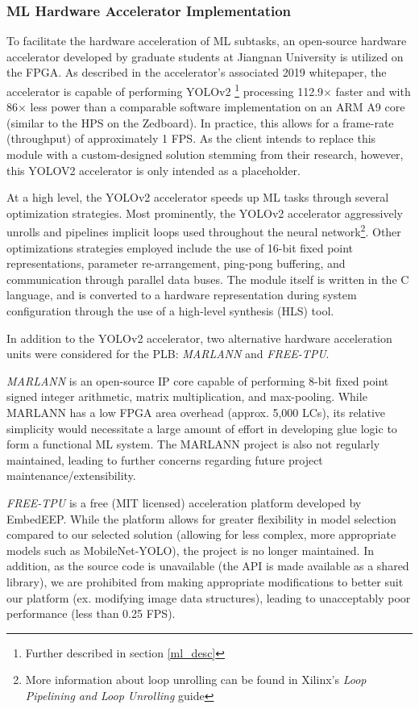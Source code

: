 \subsubsection{ML Hardware Accelerator Implementation}\label{ml_accel}
To facilitate the hardware acceleration of ML subtasks, an open-source hardware accelerator \cite{yolov2accel} developed by graduate students at Jiangnan University is utilized on the FPGA. As described in the accelerator's associated 2019 whitepaper\cite{yolov2unipaper}, the accelerator is capable of performing YOLOv2 \footnote{Further described in section \ref{ml_desc}} processing 112.9$\times$ faster and with 86$\times$ less power than a comparable software implementation on an ARM A9 core (similar to the HPS on the Zedboard). In practice, this allows for a frame-rate (throughput) of approximately 1 FPS. As the client intends to replace this module with a custom-designed solution stemming from their research, however, this YOLOV2 accelerator is only intended as a placeholder.

At a high level, the YOLOv2 accelerator speeds up ML tasks through several optimization strategies. Most prominently, the YOLOv2 accelerator aggressively unrolls and pipelines implicit loops used throughout the neural network\footnote{More information about loop unrolling can be found in Xilinx's \textit{Loop Pipelining and Loop Unrolling} guide\cite{xilinx}}. Other optimizations strategies employed include the use of 16-bit fixed point representations, parameter re-arrangement, ping-pong buffering\cite{pingpong}, and communication through parallel data buses. The module itself is written in the C language, and is converted to a hardware representation during system configuration through the use of a high-level synthesis (HLS) tool. 

In addition to the YOLOv2 accelerator, two alternative hardware acceleration units were considered for the PLB: \textit{MARLANN}\cite{marlann} and \textit{FREE-TPU}\cite{freetpu}. 

\textit{MARLANN} is an open-source IP core capable of performing 8-bit fixed point signed integer arithmetic, matrix multiplication, and max-pooling. While MARLANN has a low FPGA area overhead (approx. 5,000 LCs), its relative simplicity would necessitate a large amount of effort in developing glue logic to form a functional ML system. The MARLANN project is also not regularly maintained, leading to further concerns regarding future project maintenance/extensibility.

\textit{FREE-TPU} is a free (MIT licensed) acceleration platform developed by EmbedEEP. While the platform allows for greater flexibility in model selection compared to our selected solution (allowing for less complex, more appropriate models such as MobileNet-YOLO), the project is no longer maintained. In addition, as the source code is unavailable (the API is made available as a shared library), we are prohibited from making appropriate modifications to better suit our platform (ex. modifying image data structures), leading to unacceptably poor performance (less than 0.25 FPS).

